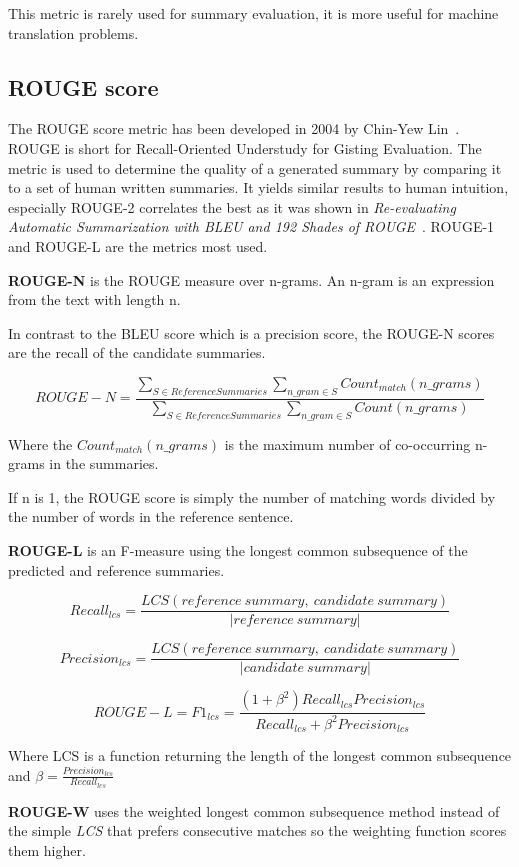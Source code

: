 This metric is rarely used for summary evaluation, it is more useful for machine translation problems.

\subsection{ROUGE score}
The ROUGE score metric has been developed in 2004 by Chin-Yew Lin~\cite{ROUGE}. ROUGE is short for Recall-Oriented Understudy for Gisting Evaluation. The metric is used to determine the quality of a generated summary by comparing it to a set of human written summaries. It yields similar results to human intuition, especially ROUGE-2 correlates the best as it was shown in \textit{Re-evaluating Automatic Summarization with BLEU and 192 Shades of ROUGE}~\cite{ShadesOfROUGE}. ROUGE-1 and ROUGE-L are the metrics most used.

\textbf{ROUGE-N} is the ROUGE measure over n-grams. An n-gram is an expression from the text with length n.

In contrast to the BLEU score which is a precision score, the ROUGE-N scores are the recall of the candidate summaries.

\[ROUGE-N = \frac{\sum_{S \in ReferenceSummaries}\sum_{n\_gram \in S} Count_{match} (n\_grams)}{\sum_{S \in ReferenceSummaries}\sum_{n\_gram \in S} Count(n\_grams)}\]

Where the \(Count_{match}(n\_grams)\) is the maximum number of co-occurring n-grams in the summaries.

If n is 1, the ROUGE score is simply the number of matching words divided by the number of words in the reference sentence.

\textbf{ROUGE-L} is an F-measure using the longest common subsequence of the predicted and reference summaries.

\[Recall_{lcs} = \frac{LCS(reference\ summary,\ candidate\ summary)}{|reference\ summary|}\]

\[Precision_{lcs} = \frac{LCS(reference\ summary,\ candidate\ summary)}{|candidate\ summary|}\]

\[ROUGE-L = F1_{lcs} = \frac{(1 + \beta^2)Recall_{lcs}Precision_{lcs}}{Recall_{lcs} + \beta^2Precision_{lcs}}\]

Where LCS is a function returning the length of the longest common subsequence and \(\beta = \frac{Precision_{lcs}}{Recall_{lcs}}\)

\textbf{ROUGE-W} uses the weighted longest common subsequence method instead of the simple \textit{LCS} that prefers consecutive matches so the weighting function scores them higher.

